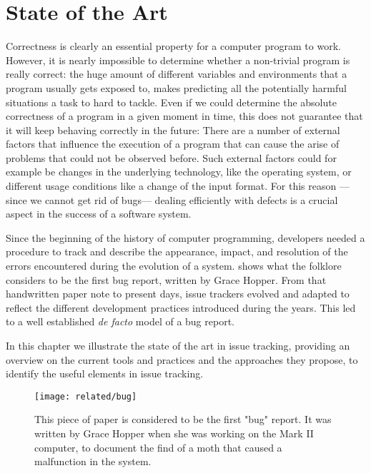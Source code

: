 
\chapter{State of the Art}\label{ch:related}


Correctness is clearly an essential property for a computer program to work.
However, it is nearly impossible to determine whether a non-trivial program is really correct: the huge amount of different variables and environments that a program usually gets exposed to, makes predicting all the potentially harmful situations a task to hard to tackle.
Even if we could determine the absolute correctness of a program in a given moment in time, this does not guarantee that it will keep behaving correctly in the future: There are a number of external factors that influence the execution of a program that can cause the arise of problems that could not be observed before.
Such external factors could for example be changes in the underlying technology, like the operating system, or different usage conditions like a change of the input format.
For this reason ---since we cannot get rid of bugs--- dealing efficiently with defects is a crucial aspect in the success of a software system.

Since the beginning of the history of computer programming, developers needed a procedure to track and describe the appearance, impact, and resolution of the errors encountered during the evolution of a system.
 shows what the folklore considers to be the first bug report, written by Grace Hopper.
From that handwritten paper note to present days, issue trackers evolved and adapted to reflect the different development practices introduced during the years.
This led to a well established \emph{de facto} model of a bug report.

In this chapter we illustrate the state of the art in issue tracking, providing an overview on the current tools and practices and the approaches they propose, to identify the useful elements in issue tracking.

\begin{figure}[t]
\centering
  \texttt{[image: related/bug]}
  \caption[The first "bug" report.]{This piece of paper is considered to be the first "bug" report. It was written by Grace Hopper when she was working on the Mark II computer, to document the find of a moth that caused a malfunction in the system.}
  \label{fig:first-bug-report}
\end{figure}


